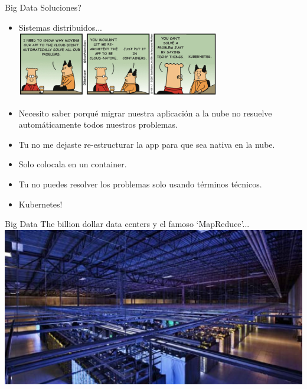 \documentclass{beamer}
\begin{document}
\begin{frame}{Big Data}
    Soluciones?
    \begin{itemize}
        \item Sistemas distribuidos... \\
        \includegraphics[width=0.7\textwidth]{figures/distributed} 
    \end{itemize}
    {\tiny 
        \begin{itemize}
         \item Necesito saber porqué migrar nuestra aplicación a la nube no resuelve automáticamente todos nuestros problemas.
         \item Tu no me dejaste re-estructurar la app para que sea nativa en la nube.
         \item Solo colocala en un container.
         \item Tu no puedes resolver los problemas solo usando términos técnicos.
         \item Kubernetes!
        \end{itemize}
    }    
\end{frame}

\begin{frame}{Big Data}
The billion dollar data centers y el famoso `MapReduce'...
  \centering
  \includegraphics[width=\textwidth]{figures/datacenter}
\end{frame}
\end{document}
